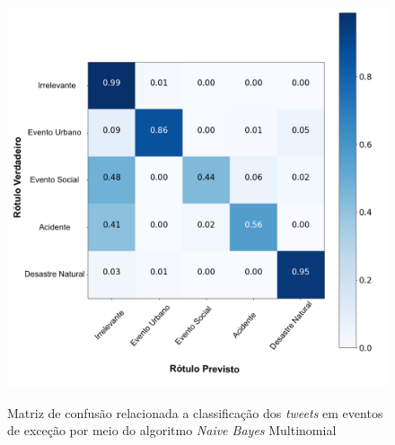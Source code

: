 \documentclass[
	12pt,				%
	oneside,			%
	a4paper,			%
	english,			%
	brazil				%
	]{abntex2ppgsi}
\begin{document}
{{\begin{apendicesenv}
\begin{figure}[!htb]
	\centering
 	  \caption{Matriz de confusão relacionada a classificação dos \textit{tweets} em eventos de exceção por meio do algoritmo \textit{Naive Bayes} Multinomial}
		\includegraphics[width=1\linewidth]{images/confusion_matrix_mnb_pt.png}
	\label{fig:confusion_matrix_mnb}
\end{figure}


\end{apendicesenv}}}
\end{document}
